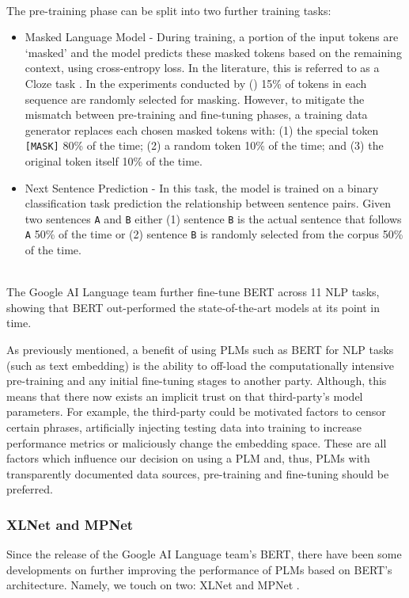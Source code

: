 \documentclass[10pt,oneside]{report}
\begin{document}
\textbf{}\\ The pre-training phase can be split into two further training tasks:
\begin{itemize}
    \item  Masked Language Model - During training, a portion of the input tokens are `masked' and the model predicts these masked tokens based on the remaining context, using cross-entropy loss\cite{zhang2018generalized}. In the literature, this is referred to as a Cloze task \cite{taylor1953cloze}. In the experiments conducted by (\citet{devlin2019bert}) 15\% of tokens in each sequence are randomly selected for masking. However, to mitigate the mismatch between pre-training and fine-tuning phases, a training data generator replaces each chosen masked tokens with: (1) the special token \texttt{[MASK]} 80\% of the time; (2) a random token 10\% of the time; and (3) the original token itself 10\% of the time.
    \item Next Sentence Prediction - In this task, the model is trained on a binary classification task prediction the relationship between sentence pairs. Given two sentences \texttt{A} and \texttt{B} either (1) sentence \texttt{B} is the actual sentence that follows \texttt{A} 50\% of the time or (2) sentence \texttt{B} is randomly selected from the corpus 50\% of the time. 
\end{itemize}


\textbf{}\\ The Google AI Language team further fine-tune BERT across 11 NLP tasks, showing that BERT out-performed the state-of-the-art models at its point in time.

As previously mentioned, a benefit of using PLMs such as BERT for NLP tasks (such as text embedding) is the ability to off-load the computationally intensive pre-training and any initial fine-tuning stages to another party. Although, this means that there now exists an implicit trust on that third-party's model parameters. For example, the third-party could be motivated factors to censor certain phrases, artificially injecting testing data into training to increase performance metrics or maliciously change the embedding space. These are all factors which influence our decision on using a PLM and, thus, PLMs with transparently documented data sources, pre-training and fine-tuning should be preferred.

\subsubsection{XLNet and MPNet}
Since the release of the Google AI Language team's BERT, there have been some developments on further improving the performance of PLMs based on BERT's architecture. Namely, we touch on two: XLNet \cite{yang2019xlnet} and MPNet \cite{song2020mpnet}.
\end{document}

